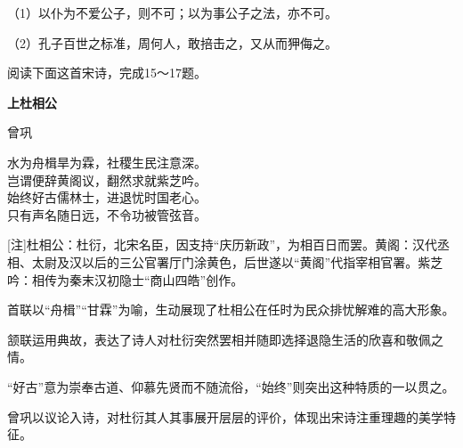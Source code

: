 \documentclass[11pt,a4paper]{ctexart}
\begin{document}

（1）以仆为不爱公子，则不可；以为事公子之法，亦不可。

（2）孔子百世之标准，周何人，敢掊击之，又从而狎侮之。


\par\vspace{2.2em}

阅读下面这首宋诗，完成15～17题。

\begin{center}{\bfseries 上杜相公}\par\vspace{0.15em}曾巩\end{center}

\begin{poem}
水为舟楫旱为霖，社稷生民注意深。\\
岂谓便辞黄阁议，翻然求就紫芝吟。\\
始终好古儒林士，进退忧时国老心。\\
只有声名随日远，不令功被管弦音。
\end{poem}

[注]杜相公：杜衍，北宋名臣，因支持“庆历新政”，为相百日而罢。黄阁：汉代丞相、太尉及汉以后的三公官署厅门涂黄色，后世遂以“黄阁”代指宰相官署。紫芝吟：相传为秦末汉初隐士“商山四皓”创作。

\begin{choices}
\item 首联以“舟楫”“甘霖”为喻，生动展现了杜相公在任时为民众排忧解难的高大形象。
\item 颔联运用典故，表达了诗人对杜衍突然罢相并随即选择退隐生活的欣喜和敬佩之情。
\item “好古”意为崇奉古道、仰慕先贤而不随流俗，“始终”则突出这种特质的一以贯之。
\item 曾巩以议论入诗，对杜衍其人其事展开层层的评价，体现出宋诗注重理趣的美学特征。
\end{choices}


\par\vspace{2.2em}

\end{document}

